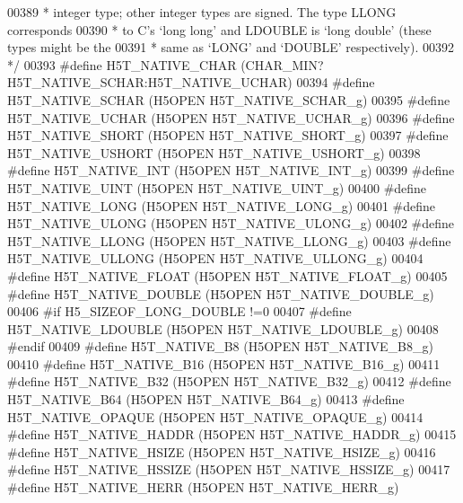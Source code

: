\begin{DoxyCode}
00389 \textcolor{comment}{ * integer type; other integer types are signed.  The type LLONG corresponds}
00390 \textcolor{comment}{ * to C's `long long' and LDOUBLE is `long double' (these types might be the}
00391 \textcolor{comment}{ * same as `LONG' and `DOUBLE' respectively).}
00392 \textcolor{comment}{ */}
00393 \textcolor{preprocessor}{#define H5T\_NATIVE\_CHAR     (CHAR\_MIN?H5T\_NATIVE\_SCHAR:H5T\_NATIVE\_UCHAR)}
00394 \textcolor{preprocessor}{#define H5T\_NATIVE\_SCHAR        (H5OPEN H5T\_NATIVE\_SCHAR\_g)}
00395 \textcolor{preprocessor}{#define H5T\_NATIVE\_UCHAR        (H5OPEN H5T\_NATIVE\_UCHAR\_g)}
00396 \textcolor{preprocessor}{#define H5T\_NATIVE\_SHORT        (H5OPEN H5T\_NATIVE\_SHORT\_g)}
00397 \textcolor{preprocessor}{#define H5T\_NATIVE\_USHORT       (H5OPEN H5T\_NATIVE\_USHORT\_g)}
00398 \textcolor{preprocessor}{#define H5T\_NATIVE\_INT          (H5OPEN H5T\_NATIVE\_INT\_g)}
00399 \textcolor{preprocessor}{#define H5T\_NATIVE\_UINT         (H5OPEN H5T\_NATIVE\_UINT\_g)}
00400 \textcolor{preprocessor}{#define H5T\_NATIVE\_LONG         (H5OPEN H5T\_NATIVE\_LONG\_g)}
00401 \textcolor{preprocessor}{#define H5T\_NATIVE\_ULONG        (H5OPEN H5T\_NATIVE\_ULONG\_g)}
00402 \textcolor{preprocessor}{#define H5T\_NATIVE\_LLONG        (H5OPEN H5T\_NATIVE\_LLONG\_g)}
00403 \textcolor{preprocessor}{#define H5T\_NATIVE\_ULLONG       (H5OPEN H5T\_NATIVE\_ULLONG\_g)}
00404 \textcolor{preprocessor}{#define H5T\_NATIVE\_FLOAT        (H5OPEN H5T\_NATIVE\_FLOAT\_g)}
00405 \textcolor{preprocessor}{#define H5T\_NATIVE\_DOUBLE       (H5OPEN H5T\_NATIVE\_DOUBLE\_g)}
00406 \textcolor{preprocessor}{#if H5\_SIZEOF\_LONG\_DOUBLE !=0}
00407 \textcolor{preprocessor}{#define H5T\_NATIVE\_LDOUBLE  (H5OPEN H5T\_NATIVE\_LDOUBLE\_g)}
00408 \textcolor{preprocessor}{#endif}
00409 \textcolor{preprocessor}{#define H5T\_NATIVE\_B8       (H5OPEN H5T\_NATIVE\_B8\_g)}
00410 \textcolor{preprocessor}{#define H5T\_NATIVE\_B16      (H5OPEN H5T\_NATIVE\_B16\_g)}
00411 \textcolor{preprocessor}{#define H5T\_NATIVE\_B32      (H5OPEN H5T\_NATIVE\_B32\_g)}
00412 \textcolor{preprocessor}{#define H5T\_NATIVE\_B64      (H5OPEN H5T\_NATIVE\_B64\_g)}
00413 \textcolor{preprocessor}{#define H5T\_NATIVE\_OPAQUE       (H5OPEN H5T\_NATIVE\_OPAQUE\_g)}
00414 \textcolor{preprocessor}{#define H5T\_NATIVE\_HADDR    (H5OPEN H5T\_NATIVE\_HADDR\_g)}
00415 \textcolor{preprocessor}{#define H5T\_NATIVE\_HSIZE    (H5OPEN H5T\_NATIVE\_HSIZE\_g)}
00416 \textcolor{preprocessor}{#define H5T\_NATIVE\_HSSIZE   (H5OPEN H5T\_NATIVE\_HSSIZE\_g)}
00417 \textcolor{preprocessor}{#define H5T\_NATIVE\_HERR     (H5OPEN H5T\_NATIVE\_HERR\_g)}

\end{DoxyCode}
